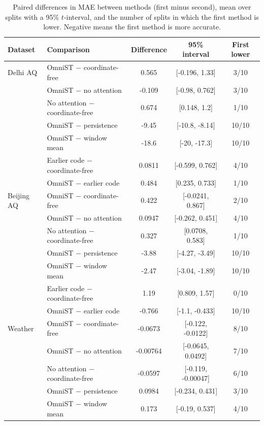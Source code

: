 \begin{table}[htbp]
\caption{Paired differences in MAE between methods (first minus second), mean over splits with a 95\% $t$-interval, and the number of splits in which the first method is lower. Negative means the first method is more accurate.}
\label{tab:paired}
\centering\small
\begin{tabular}{llccc}
\toprule
\textbf{Dataset} & \textbf{Comparison} & \textbf{Difference} & \textbf{95\% interval} & \textbf{First lower} \\
\midrule
Delhi AQ & OmniST $-$ coordinate-free & 0.565 & [-0.196, 1.33] & 3/10 \\
 & OmniST $-$ no attention & -0.109 & [-0.98, 0.762] & 3/10 \\
 & No attention $-$ coordinate-free & 0.674 & [0.148, 1.2] & 1/10 \\
 & OmniST $-$ persistence & -9.45 & [-10.8, -8.14] & 10/10 \\
 & OmniST $-$ window mean & -18.6 & [-20, -17.3] & 10/10 \\
 & Earlier code $-$ coordinate-free & 0.0811 & [-0.599, 0.762] & 4/10 \\
 & OmniST $-$ earlier code & 0.484 & [0.235, 0.733] & 1/10 \\
\midrule
Beijing AQ & OmniST $-$ coordinate-free & 0.422 & [-0.0241, 0.867] & 2/10 \\
 & OmniST $-$ no attention & 0.0947 & [-0.262, 0.451] & 4/10 \\
 & No attention $-$ coordinate-free & 0.327 & [0.0708, 0.583] & 1/10 \\
 & OmniST $-$ persistence & -3.88 & [-4.27, -3.49] & 10/10 \\
 & OmniST $-$ window mean & -2.47 & [-3.04, -1.89] & 10/10 \\
 & Earlier code $-$ coordinate-free & 1.19 & [0.809, 1.57] & 0/10 \\
 & OmniST $-$ earlier code & -0.766 & [-1.1, -0.433] & 10/10 \\
\midrule
Weather & OmniST $-$ coordinate-free & -0.0673 & [-0.122, -0.0122] & 8/10 \\
 & OmniST $-$ no attention & -0.00764 & [-0.0645, 0.0492] & 7/10 \\
 & No attention $-$ coordinate-free & -0.0597 & [-0.119, -0.00047] & 6/10 \\
 & OmniST $-$ persistence & 0.0984 & [-0.234, 0.431] & 3/10 \\
 & OmniST $-$ window mean & 0.173 & [-0.19, 0.537] & 4/10 \\

\end{tabular}
\end{table}
